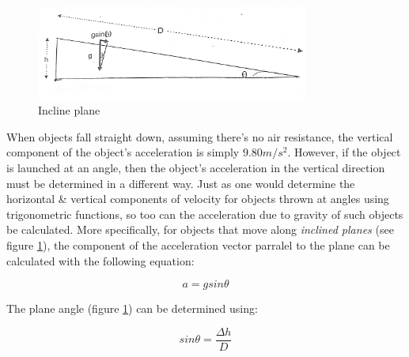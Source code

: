 \documentclass[a4paper,12pt]{article}
\begin{document}
\begin{figure}[h!]
    \centering
    \includegraphics[width=0.8\textwidth]{figure1_inclineplane} %
    \caption{Incline plane}
    \label{fig:inclineplane}
\end{figure}

When objects fall straight down, assuming there's no air resistance, the vertical component of the object's acceleration is simply $9.80{m/s^2}$. However, if the object is launched at an angle, then the object's acceleration in the vertical direction must be determined in a different way. Just as one would determine the horizontal \& vertical components of velocity for objects thrown at angles using trigonometric functions, so too can the acceleration due to gravity of such objects be calculated. More specifically, for objects that move along \textit{inclined planes} (see figure \ref{fig:inclineplane}), the component of the acceleration vector parralel to the plane can be calculated with the following equation:

\begin{equation}
a = gsin\theta
\end{equation}

The plane angle (figure \ref{fig:inclineplane}) can be determined using:

\begin{equation}	
sin\theta = \frac{\Delta{h}}{D}
\end{equation}
\end{document}
